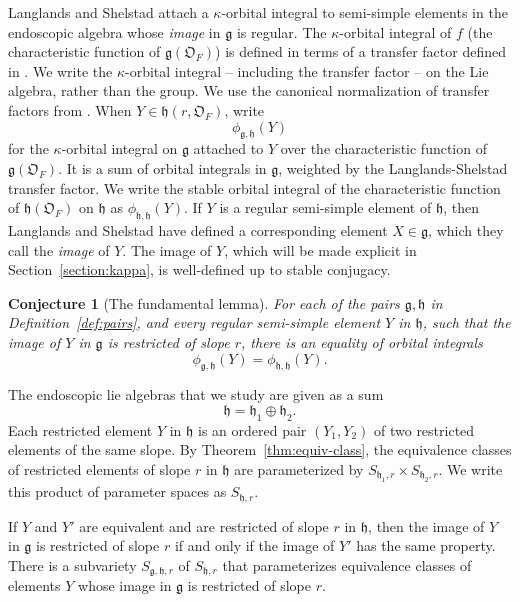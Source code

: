 \documentclass[11pt]{amsart}
\newtheorem{conjecture}[theorem]{Conjecture}
\theoremstyle{definition}
\theoremstyle{remark}
\numberwithin{equation}{theorem}
\def\F{{F}}
\def\A{{\mathfrak{O}_\F}}
\def\lie#1{{\mathfrak{#1}}}
\def\orb#1#2{{\phi_{\lie{#1},\lie{#2}}}}
\begin{document}
Langlands and Shelstad attach a $\kappa$-orbital integral to
semi-simple elements in the endoscopic algebra whose {\it image\/}
in $\lie{g}$ is regular. The $\kappa$-orbital integral of $f$ (the
characteristic function of $\lie{g}(\A)$) is defined in terms of a
transfer factor defined in \cite{Xf}.  We write the
$\kappa$-orbital integral -- including the transfer factor -- on
the Lie algebra, rather than the group. We use the canonical
normalization of transfer factors from \cite{HS}. When
$Y\in\lie{h}(r,\A)$, write
   \begin{equation}\orb{g}{h}(Y)\end{equation}
for the $\kappa$-orbital integral on $\lie{g}$ attached to $Y$
over the characteristic function of $\lie{g}(\A)$. It is a sum of
orbital integrals in $\lie{g}$, weighted by the Langlands-Shelstad
transfer factor. We write the stable orbital integral of the
characteristic function of $\lie{h}(\A)$ on $\lie{h}$ as
$\orb{h}{h}(Y)$.  If $Y$ is a regular semi-simple element of
$\lie{h}$, then Langlands and Shelstad have defined a
corresponding element $X\in\lie{g}$, which they call the {\it
image\/} of $Y$. The image of $Y$, which will be made explicit in
Section~\ref{section:kappa}, is well-defined up to stable
conjugacy.


\begin{conjecture}[The fundamental lemma]
For each of the pairs $\lie{g},\lie{h}$ in
Definition~\ref{def:pairs}, and every regular semi-simple element
$Y$ in $\lie{h}$, such that the image of $Y$ in $\lie{g}$ is
restricted of slope $r$, there is an equality of orbital integrals
   \begin{equation}
   \orb{g}{h}(Y) = \orb{h}{h}(Y).
   \label{eqn:fl}
  \end{equation}
\end{conjecture}
\smallskip


The endoscopic lie algebras that we study are given as a sum
  \begin{equation}\lie{h} = \lie{h}_1\oplus \lie{h}_2.\end{equation}
Each restricted  element $Y$ in $\lie{h}$ is an ordered pair
$(Y_1,Y_2)$ of two restricted  elements of the same slope. By
Theorem~\ref{thm:equiv-class}, the equivalence classes of
restricted elements of slope $r$ in $\lie{h}$ are parameterized by
$S_{\lie{h}_1,r}\times S_{\lie{h}_2,r}.$  We write this product of
parameter spaces as $S_{\lie{h},r}$.

If $Y$ and $Y'$ are equivalent and are restricted of slope $r$ in
$\lie{h}$, then the image of $Y$ in $\lie{g}$ is restricted of
slope $r$ if and only if the image of $Y'$ has the same property.
There is a subvariety $S_{\lie{g},\lie{h},r}$ of $S_{\lie{h},r}$
that parameterizes equivalence classes of elements $Y$ whose image
in $\lie{g}$ is restricted of slope $r$.
\end{document}
